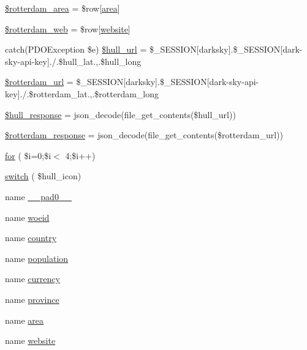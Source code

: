 \begin{DoxyCompactItemize}
\item 
\mbox{\hyperlink{index_8php_a9322b687154ace187cdafd89421852c4}{\$rotterdam\+\_\+area}} = \$row\mbox{[}\textquotesingle{}\mbox{\hyperlink{index_8php_a5198216176428aa2303311f956213f33}{area}}\textquotesingle{}\mbox{]}
\item 
\mbox{\hyperlink{index_8php_a1590932cbcc34b305f9b67f5cf5fce87}{\$rotterdam\+\_\+web}} = \$row\mbox{[}\textquotesingle{}\mbox{\hyperlink{index_8php_a8c56014cff17c1ced653aa98455da680}{website}}\textquotesingle{}\mbox{]}
\item 
catch(P\+D\+O\+Exception \$e) \mbox{\hyperlink{index_8php_a58f6123edc9a89eb61455c98ec3bb15d}{\$hull\+\_\+url}} = \$\+\_\+\+S\+E\+S\+S\+I\+ON\mbox{[}\textquotesingle{}darksky\textquotesingle{}\mbox{]}.\$\+\_\+\+S\+E\+S\+S\+I\+ON\mbox{[}\textquotesingle{}dark-\/sky-\/api-\/key\textquotesingle{}\mbox{]}.\textquotesingle{}/\textquotesingle{}.\$hull\+\_\+lat.\textquotesingle{},\textquotesingle{}.\$hull\+\_\+long
\item 
\mbox{\hyperlink{index_8php_adeffa649498546844bc0e7421bd4b140}{\$rotterdam\+\_\+url}} = \$\+\_\+\+S\+E\+S\+S\+I\+ON\mbox{[}\textquotesingle{}darksky\textquotesingle{}\mbox{]}.\$\+\_\+\+S\+E\+S\+S\+I\+ON\mbox{[}\textquotesingle{}dark-\/sky-\/api-\/key\textquotesingle{}\mbox{]}.\textquotesingle{}/\textquotesingle{}.\$rotterdam\+\_\+lat.\textquotesingle{},\textquotesingle{}.\$rotterdam\+\_\+long
\item 
\mbox{\hyperlink{index_8php_a1c4e9907a22b4c6da1c5a7837a4d539e}{\$hull\+\_\+response}} = json\+\_\+decode(file\+\_\+get\+\_\+contents(\$hull\+\_\+url))
\item 
\mbox{\hyperlink{index_8php_a3257c196b67efb81ddcc803e2cac7ed2}{\$rotterdam\+\_\+response}} = json\+\_\+decode(file\+\_\+get\+\_\+contents(\$rotterdam\+\_\+url))
\item 
\mbox{\hyperlink{index_8php_aa11bce3c9d33806cade344b0536e0508}{for}} ( \$i=0;\$i$<$ 4;\$i++)
\item 
\mbox{\hyperlink{index_8php_ad2faa0eadeef0c97994ef3b2d91b08ea}{switch}} ( \$hull\+\_\+icon)
\item 
name \mbox{\hyperlink{index_8php_a36342860613418f919ffbf3aa4246442}{\+\_\+\+\_\+pad0\+\_\+\+\_\+}}
\item 
name \mbox{\hyperlink{index_8php_a351cdce8b3559e1c850fe0223c244ef7}{woeid}}
\item 
name \mbox{\hyperlink{index_8php_a0f0752705301c982dc8994ebc993e6e9}{country}}
\item 
name \mbox{\hyperlink{index_8php_aa78fa356925cd3f67d485c4d6846202b}{population}}
\item 
name \mbox{\hyperlink{index_8php_abd84e0698c321abdbf211d5b8425d0b5}{currency}}
\item 
name \mbox{\hyperlink{index_8php_a38d70414c65575df5643ad4296c9db2e}{province}}
\item 
name \mbox{\hyperlink{index_8php_a5198216176428aa2303311f956213f33}{area}}
\item 
name \mbox{\hyperlink{index_8php_a8c56014cff17c1ced653aa98455da680}{website}}
\end{DoxyCompactItemize}



